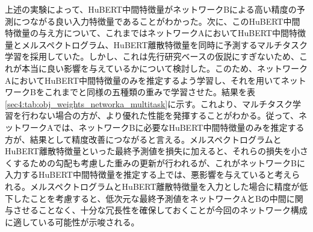 \documentclass[12pt]{jarticle}
\numberwithin{equation}{section}    %
\numberwithin{figure}{section}      %
\numberwithin{table}{section}      %
\begin{document}
上述の実験によって、HuBERT中間特徴量がネットワークBによる高い精度の予測につながる良い入力特徴量であることがわかった。次に、このHuBERT中間特徴量の与え方について、これまではネットワークAにおいてHuBERT中間特徴量とメルスペクトログラム、HuBERT離散特徴量を同時に予測するマルチタスク学習を採用していた。しかし、これは先行研究ベースの仮説にすぎないため、これが本当に良い影響を与えているかについて検討した。このため、ネットワークAにおいてHuBERT中間特徴量のみを推定するよう学習し、それを用いてネットワークBをこれまでと同様の五種類の重みで学習させた。結果を表\ref{sec4:tab:obj_weights_networka_multitask}に示す。これより、マルチタスク学習を行わない場合の方が、より優れた性能を発揮することがわかる。従って、ネットワークAでは、ネットワークBに必要なHuBERT中間特徴量のみを推定する方が、結果として精度改善につながると言える。メルスペクトログラムとHuBERT離散特徴量といった最終予測値を損失に加えると、それらの損失を小さくするための勾配も考慮した重みの更新が行われるが、これがネットワークBに入力するHuBERT中間特徴量を推定する上では、悪影響を与えていると考えられる。メルスペクトログラムとHuBERT離散特徴量を入力とした場合に精度が低下したことを考慮すると、低次元な最終予測値をネットワークAとBの中間に関与させることなく、十分な冗長性を確保しておくことが今回のネットワーク構成に適している可能性が示唆される。
\end{document}
